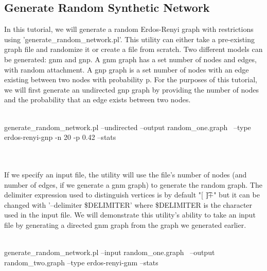 \subsection{Generate Random Synthetic Network}
In this tutorial, we will generate a random Erdos-Renyi graph with restrictions using 'generate\_random\_network.pl'. This utility can either take a pre-existing graph file and randomize it or create a file from scratch. Two different models can be generated: gnm and gnp. A gnm graph has a set number of nodes and edges, with random attachment. A gnp graph is a set number of nodes with an edge existing between two nodes with probability p.  For the purposes of this tutorial, we will first generate an undirected gnp graph by providing the number of nodes and the probability that an edge exists between two nodes.
\\
\\
\begin{boxedverbatim}
generate_random_network.pl --undirected --output random_one.graph \
 --type erdos-renyi-gnp -n 20 -p 0.42 --stats
\end{boxedverbatim}
\\
\\
If we specify an input file, the utility will use the file's number of nodes (and number of edges, if we generate a gnm graph) to generate the random graph. The delimiter expression used to distinguish vertices is by default "[ \t]+" but it can be changed with '--delimiter \$DELIMITER' where \$DELIMITER is the character used in the input file. We will demonstrate this utility's ability to take an input file by generating a directed gnm graph from the graph we generated earlier.
\\
\\
\begin{boxedverbatim}
generate_random_network.pl --input random_one.graph \
 --output random_two.graph --type erdos-renyi-gnm --stats
\end{boxedverbatim} 